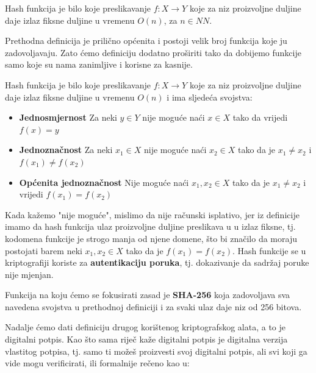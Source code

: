 \documentclass[12pt]{report}
\begin{document}
\begin{definicija} 
Hash funkcija je bilo koje preslikavanje $f\colon X \to Y$ koje za niz proizvoljne duljine daje izlaz fiksne duljine u vremenu $O(n)$, za $n \in NN$. 
\end{definicija}

Prethodna definicija je prilično općenita i postoji velik broj funkcija koje ju zadovoljavaju. Zato ćemo definiciju dodatno proširiti tako da dobijemo funkcije samo koje su nama zanimljive i korisne za kasnije.

\begin{definicija}
Hash funkcija je bilo koje preslikavanje $f\colon X \to Y$ koje za niz proizvoljne duljine daje izlaz fiksne duljine u vremenu $O(n)$ i ima sljedeća svojstva:
\begin{itemize}
    \item \textbf{Jednosmjernost} Za neki $y \in Y$ nije moguće naći $x \in X$ tako da vrijedi $f(x)=y$
    \item \textbf{Jednoznačnost} Za neki $x_{1} \in X$ nije moguće naći $x_{2} \in X$ tako da je $x_{1}\not=x_{2}$ i $f(x_{1}) \not= f(x_{2})$
    \item \textbf{Općenita jednoznačnost} Nije moguće naći $x_{1}, x_{2} \in X$ tako da je $x_{1} \not= x_{2}$ i vrijedi $f(x_{1}) = f(x_{2})$
\end{itemize}
\end{definicija}

Kada kažemo "nije moguće", mislimo da nije računski isplativo, jer iz definicije imamo da hash funkcija ulaz proizvoljne duljine preslikava u u izlaz fiksne, tj. kodomena funkcije je strogo manja od njene domene, što bi značilo da moraju postojati barem neki $x_{1}, x_{2} \in X$ tako da je $f(x_{1}) = f(x_{2})$. Hash funkcije se u kriptografiji koriste za \textbf{autentikaciju poruka}, tj. dokazivanje da sadržaj poruke nije mjenjan. 

Funkcija na koju ćemo se fokusirati zasad je \textbf{SHA-256} koja zadovoljava sva navedena svojstva u prethodnoj definiciji i za svaki ulaz daje niz od 256 bitova.

Nadalje ćemo dati definiciju drugog korištenog kriptografskog alata, a to je digitalni potpis. Kao što sama riječ kaže digitalni potpis je digitalna verzija vlastitog potpisa, tj. samo ti možeš proizvesti svoj digitalni potpis, ali svi koji ga vide mogu verificirati, ili formalnije rečeno kao u\cite{bitcoincrypto}:
\end{document}

